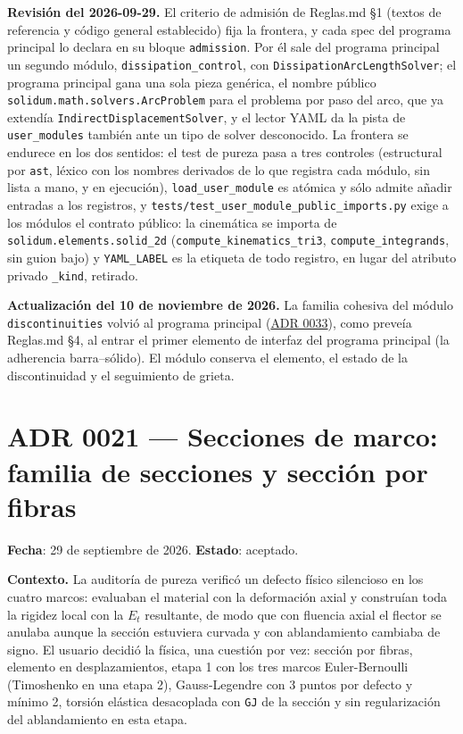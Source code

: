 \documentclass[11pt,oneside]{report}
\begin{document}
\textbf{Revisión del 2026-09-29.} El criterio de admisión de Reglas.md §1 (textos de referencia y código general establecido) fija la frontera, y cada spec del programa principal lo declara en su bloque \texttt{admission}. Por él sale del programa principal un segundo módulo, \texttt{dissipation\_\allowbreak{}control}, con \texttt{DissipationArcLengthSolver}; el programa principal gana una sola pieza genérica, el nombre público \texttt{solidum.\allowbreak{}math.\allowbreak{}solvers.\allowbreak{}ArcProblem} para el problema por paso del arco, que ya extendía \texttt{IndirectDisplacementSolver}, y el lector YAML da la pista de \texttt{user\_modules} también ante un tipo de solver desconocido. La frontera se endurece en los dos sentidos: el test de pureza pasa a tres controles (estructural por \texttt{ast}, léxico con los nombres derivados de lo que registra cada módulo, sin lista a mano, y en ejecución), \texttt{load\_user\_module} es atómica y sólo admite añadir entradas a los registros, y \texttt{tests/\allowbreak{}test\_\allowbreak{}user\_\allowbreak{}module\_\allowbreak{}public\_\allowbreak{}imports.\allowbreak{}py} exige a los módulos el contrato público: la cinemática se importa de \texttt{solidum.\allowbreak{}elements.\allowbreak{}solid\_\allowbreak{}2d} (\texttt{compute\_\allowbreak{}kinematics\_\allowbreak{}tri3}, \texttt{compute\_\allowbreak{}integrands}, sin guion bajo) y \texttt{YAML\_LABEL} es la etiqueta de todo registro, en lugar del atributo privado \texttt{\_kind}, retirado.

\textbf{Actualización del 10 de noviembre de 2026.} La familia cohesiva del módulo \texttt{discontinuities} volvió al programa principal (\hyperref[adr:0033]{ADR 0033}), como preveía Reglas.md §4, al entrar el primer elemento de interfaz del programa principal (la adherencia barra--sólido). El módulo conserva el elemento, el estado de la discontinuidad y el seguimiento de grieta.

\section{ADR 0021 --- Secciones de marco: familia de secciones y sección por fibras}
\label{adr:0021}

\textbf{Fecha}: 29 de septiembre de 2026. \textbf{Estado}: aceptado.

\textbf{Contexto.} La auditoría de pureza verificó un defecto físico silencioso en los cuatro marcos: evaluaban el material con la deformación axial y construían toda la rigidez local con la $E_t$ resultante, de modo que con fluencia axial el flector se anulaba aunque la sección estuviera curvada y con ablandamiento cambiaba de signo. El usuario decidió la física, una cuestión por vez: sección por fibras, elemento en desplazamientos, etapa 1 con los tres marcos Euler-Bernoulli (Timoshenko en una etapa 2), Gauss-Legendre con 3 puntos por defecto y mínimo 2, torsión elástica desacoplada con \texttt{GJ} de la sección y sin regularización del ablandamiento en esta etapa.
\end{document}
